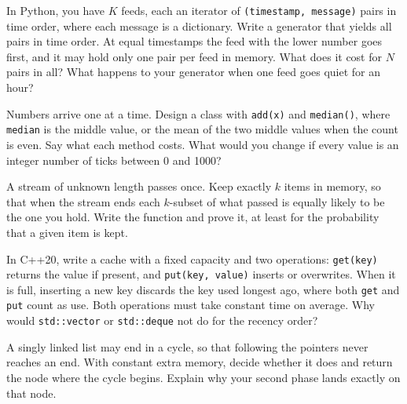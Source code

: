 \begin{question}\label{iq:iv3:algorithms:21}
In Python, you have $K$ feeds, each an iterator of \texttt{(timestamp, message)} pairs in time order, where each message is a dictionary. Write a generator that yields all pairs in time order. At equal timestamps the feed with the lower number goes first, and it may hold only one pair per feed in memory. What does it cost for $N$ pairs in all? What happens to your generator when one feed goes quiet for an hour?
\end{question}

\begin{question}\label{iq:iv3:algorithms:22}
Numbers arrive one at a time. Design a class with \texttt{add(x)} and \texttt{median()}, where \texttt{median} is the middle value, or the mean of the two middle values when the count is even. Say what each method costs. What would you change if every value is an integer number of ticks between 0 and 1000?
\end{question}

\begin{question}\label{iq:iv3:algorithms:23}
A stream of unknown length passes once. Keep exactly $k$ items in memory, so that when the stream ends each $k$-subset of what passed is equally likely to be the one you hold. Write the function and prove it, at least for the probability that a given item is kept.
\end{question}

\begin{question}\label{iq:iv3:algorithms:24}
In C++20, write a cache with a fixed capacity and two operations: \texttt{get(key)} returns the value if present, and \texttt{put(key, value)} inserts or overwrites. When it is full, inserting a new key discards the key used longest ago, where both \texttt{get} and \texttt{put} count as use. Both operations must take constant time on average. Why would \texttt{std::vector} or \texttt{std::deque} not do for the recency order?
\end{question}

\begin{question}\label{iq:iv3:algorithms:25}
A singly linked list may end in a cycle, so that following the pointers never reaches an end. With constant extra memory, decide whether it does and return the node where the cycle begins. Explain why your second phase lands exactly on that node.
\end{question}


